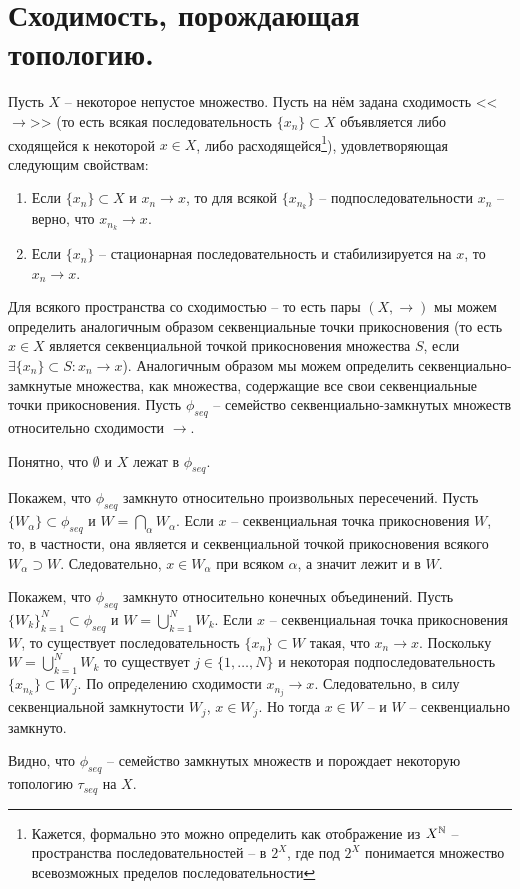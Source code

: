 \section{Сходимость, порождающая топологию.}
\begin{definition}
    Пусть $X$ -- некоторое непустое множество.
    Пусть на нём задана сходимость <<$\rightarrow$>> (то есть всякая последовательность $\{x_n\} \subset X$ объявляется либо сходящейся к некоторой $x \in X$, либо расходящейся\footnote{Кажется, формально это можно определить как отображение из $X^{\mathbb{N}}$ -- пространства последовательностей -- в $2^X$, где под $2^X$ понимается множество всевозможных пределов последовательности}), удовлетворяющая следующим свойствам:
    \begin{enumerate}
        \item Если $\{x_n\} \subset X$ и $x_n \rightarrow x$, то для всякой $\{x_{n_k}\}$ -- подпоследовательности $x_n$ -- верно, что $x_{n_k} \rightarrow x$.
        \item Если $\{x_n\}$ -- стационарная последовательность и стабилизируется на $x$, то $x_n \rightarrow x$.
    \end{enumerate}
\end{definition}
\begin{note}
    Для всякого пространства со сходимостью -- то есть пары $(X, \rightarrow)$ мы можем определить аналогичным образом секвенциальные точки прикосновения (то есть $x \in X$ является секвенциальной точкой прикосновения множества $S$, если $\exists \{x_n\}\subset S\colon x_n \rightarrow x$).
    Аналогичным образом мы можем определить секвенциально-замкнутые множества, как множества, содержащие все свои секвенциальные точки прикосновения.
    Пусть $\phi_{seq}$ -- семейство секвенциально-замкнутых множеств относительно сходимости $\rightarrow$.

    Понятно, что $\emptyset$ и $X$ лежат в $\phi_{seq}$.

    Покажем, что $\phi_{seq}$ замкнуто относительно произвольных пересечений.
    Пусть $\{W_\alpha\} \subset \phi_{seq}$ и $W = \bigcap_{\alpha} W_\alpha$.
    Если $x$ -- секвенциальная точка прикосновения $W$, то, в частности, она является и секвенциальной точкой прикосновения всякого $W_\alpha \supset W$.
    Следовательно, $x \in W_\alpha$ при всяком $\alpha$, а значит лежит и в $W$.

    Покажем, что $\phi_{seq}$ замкнуто относительно конечных объединений.
    Пусть $\{W_k\}_{k = 1}^{N} \subset \phi_{seq}$ и $W = \bigcup_{k = 1}^{N} W_k$.
    Если $x$ -- секвенциальная точка прикосновения $W$, то существует последовательность $\{x_n\} \subset W$ такая, что $x_n \rightarrow x$.
    Поскольку $W = \bigcup_{k = 1}^{N} W_k$ то существует $j \in \{1, \ldots, N\}$ и некоторая подпоследовательность $\{x_{n_k}\} \subset W_j$.
    По определению сходимости $x_{n_j} \rightarrow x$.
    Следовательно, в силу секвенциальной замкнутости $W_j$, $x \in W_j$.
    Но тогда $x \in W$ -- и $W$ -- секвенциально замкнуто.

    Видно, что $\phi_{seq}$ -- семейство замкнутых множеств и порождает некоторую топологию $\tau_{seq}$ на $X$.
\end{note}
